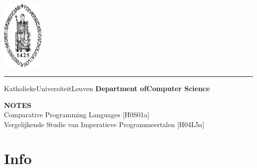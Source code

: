 \documentclass[a4paper]{article}
\begin{document}
\begin{titlepage}
    \newpage
    \thispagestyle{empty}
    \frenchspacing
    \hspace{-0.2cm}
    \includegraphics[height=3.4cm]{assets/sedes}
    \hspace{0.2cm}
    \rule{0.5pt}{3.4cm}
    \hspace{0.2cm}
    \begin{minipage}[b]{8cm}
        \Large{Katholieke\newline Universiteit\newline Leuven}\smallskip\newline
        \large{}\smallskip\newline
        \textbf{Department of\newline Computer Science}\smallskip
    \end{minipage}
    \vspace*{3.2cm}\vfill
    \begin{center}
        \begin{minipage}[t]{\textwidth}
            \begin{center}
                \large{\rm{\textbf{\uppercase{Notes}}}}\\
                \large{\rm{Comparative Programming Languages [H0S01a]}}\\
                \large{\rm{Vergelijkende Studie van Imperatieve Programmeertalen [H04L5a]}}
            \end{center}
        \end{minipage}
    \end{center}
    \vfill
    \hfill{}
\end{titlepage}

\tableofcontents

\newpage

\section{Info}
\end{document}
